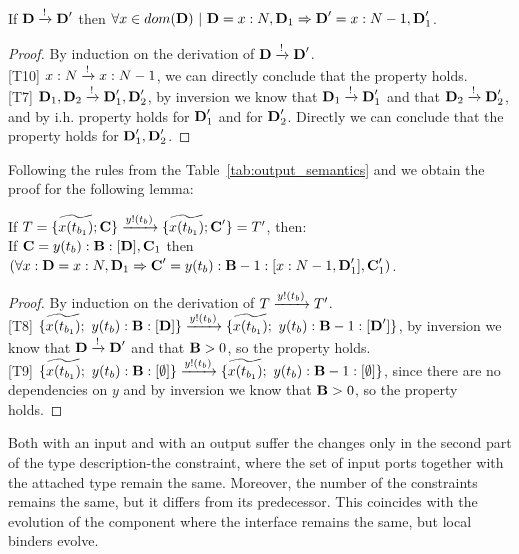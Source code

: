 \begin{proposition} If $\textbf{D} \xrightarrow{\text{!}} \textbf{D}'$ then $\forall x\in dom(\D)\ |\ \D=\pev{x}{N},\D_1 \Rightarrow \D'=\pev{x}{N-1},\D_1' $. 


\end{proposition}
 
\begin{proof}{By induction on the derivation of $\textbf{D} \xrightarrow{\text{!}} \textbf{D}'$.}\\

[T10] $x:N \xrightarrow{\text{!}} x:N-1$, we can directly conclude that the property holds.\\

[T7] $\textbf{D}_1,\textbf{D}_2 \xrightarrow{\text{!}} \textbf{D}_1',\textbf{D}_2'$, by inversion we know that $\textbf{D}_1 \xrightarrow{\text{!}} \textbf{D}_1'$ and that $\textbf{D}_2 \xrightarrow{\text{!}} \textbf{D}_2'$, and by i.h. property holds for $\textbf{D}_1'$ and for $\textbf{D}_2'$. Directly we can conclude that the property holds for $\textbf{D}_1',\textbf{D}_2'$.

\end{proof}






Following the rules from the Table~\ref{tab:output_semantics} and  we obtain the proof for the following lemma:

\begin{lemma} If $T=\{\widetilde{x(t_{b_1})};\textbf{C}\}\xrightarrow{\text{$y!(t_b)$}} \{\widetilde{x(t_{b_1})};\textbf{C}'\}=T'$, then:\\

If $\textbf{C}=y(t_b):\textbf{B}:[\textbf{D}],\textbf{C}_1$ then $(\forall x:\textbf{D}=x:N,\textbf{D}_1\Rightarrow \textbf{C}'=y(t_b):\textbf{B}-1:[x:N-1,\textbf{D}_1'],\textbf{C}_1')$.



\end{lemma}
 
\begin{proof}{By induction on the derivation of $T \xrightarrow{\text{$y!(t_b)$}} T'$.}\\

[T8] $\{\widetilde{\depen{x}{t_{b_1}}};\ \constr{y}{t_b}{\B}{\D}\}\outy \{\widetilde{\depen{x}{t_{b_1}}};\ \constr{y}{t_b}{\B-1}{\D'}\}$, by inversion we know that $\textbf{D} \xrightarrow{\text{!}} \textbf{D}'$ and that $\textbf{B}>0$, so the property holds.\\

[T9] $\{\widetilde{\depen{x}{t_{b_1}}};\ \constr{y}{t_b}{\B}{\emptyset}\}\outy \{\widetilde{\depen{x}{t_{b_1}}};\ \constr{y}{t_b}{\B-1}{\emptyset}\}$, since there are no dependencies on $y$ and by inversion we know that $\textbf{B}>0$, so the property holds.

\end{proof}

Both  with an input and  with an output suffer the changes only in the second part of the type description-the constraint, where the set of input ports together with the attached type remain the same. Moreover, the number of the constraints remains the same, but it differs from its predecessor. This coincides with the evolution of the component where the interface remains the same, but local binders evolve.
